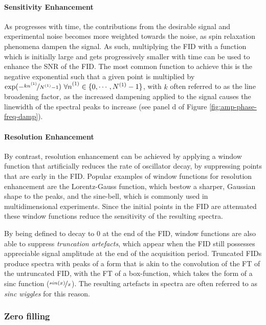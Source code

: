 \paragraph{Sensitivity Enhancement} As  progresses with time, the
contributions from the desirable signal and experimental noise becomes more
weighted towards the noise, as spin relaxation phenomena dampen the signal. As
such, multiplying the \ac{FID} with a function which is initially large and
gets progressively smaller with time can be used to enhance the \ac{SNR} of the
\ac{FID}. The most common function to achieve this is the negative exponential
such that a given point is multiplied by $\exp(-\nicefrac{k \none}{\None - 1})\
\forall \none \in \lbrace 0, \cdots, \None - 1\rbrace$, with $k$ often
referred to as the line broadening factor, as the increased dampening applied
to the signal causes the linewidth of the spectral peaks to increase (see panel
d of Figure \ref{fig:amp-phase-freq-damp}).

\paragraph{Resolution Enhancement} By contrast, resolution enhancement can be
achieved by applying a window function that artificially reduces the rate of
oscillator decay, by suppressing points that are early in the \ac{FID}. Popular
examples of window functions for resolution enhancement are the Lorentz-Gauss
function, which bestow a sharper, Gaussian shape to the peaks, and the
sine-bell, which is commonly used in multidimensional experiments. Since the
initial points in the \ac{FID} are attenuated these window functions reduce the
sensitivity of the resulting spectra.

By being defined to decay to $0$ at the end of the \ac{FID}, window functions
are also able to suppress \emph{truncation artefacts}, which appear when the
\ac{FID} still possesses appreciable signal amplitude at the end of the
acquisition period. Truncated \acp{FID} produce spectra with peaks of a form
that is akin to the convolution of the \ac{FT} of the untruncated \ac{FID},
with the \ac{FT} of a box-function, which takes the form of a sinc function
($\nicefrac{sin(x)}{x}$). The resulting artefacts in spectra are often referred
to as \emph{sinc wiggles} for this reason.

\subsubsection{Zero filling}

